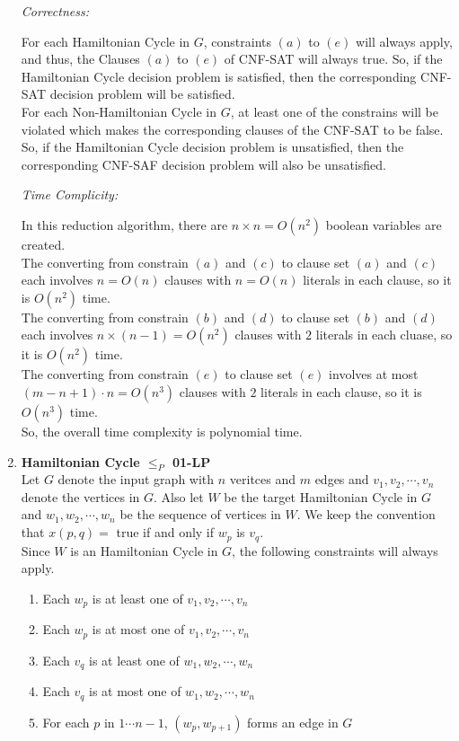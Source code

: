 \documentclass[12pt,letterpaper]{article}
\def\pp{\par\noindent}
\newcommand{\correctness}{\medskip\pp\textit{Correctness:}\par}
\newcommand{\timecomplexity}{\medskip\pp\textit{Time Complicity:}\par}
\begin{document}
\begin{enumerate}
\begin{enumerate}[itemsep=0mm]
		\end{enumerate}
		\correctness
		For each Hamiltonian Cycle in $G$, constraints $(a)$ to $(e)$ will always apply, and thus, the Clauses $(a)$ to $(e)$ of CNF-SAT will always true. So, if the Hamiltonian Cycle decision problem is satisfied, then the corresponding CNF-SAT decision problem will be satisfied.\\
		For each Non-Hamiltonian Cycle in $G$, at least one of the constrains will be violated which makes the corresponding clauses of the CNF-SAT to be false. So, if the Hamiltonian Cycle decision problem is unsatisfied, then the corresponding CNF-SAF decision problem will also be unsatisfied.
		\timecomplexity
		In this reduction algorithm, there are $n\times n=O(n^2)$ boolean variables are created.\\
		The converting from constrain $(a)$ and $(c)$ to clause set $(a)$ and $(c)$ each involves $n=O(n)$ clauses with $n=O(n)$ literals in each clause, so it is $O(n^2)$ time.\\
		The converting from constrain $(b)$ and $(d)$ to clause set $(b)$ and $(d)$ each involves $n\times(n-1)=O(n^2)$ clauses with $2$ literals in each cluase, so it is $O(n^2)$ time.\\
		The converting from constrain $(e)$ to clause set $(e)$ involves at most $(m-n+1)\cdot n=O(n^3)$ clauses with $2$ literals in each clause, so it is $O(n^3)$ time.\\
		So, the overall time complexity is polynomial time.
	\item \textbf{Hamiltonian Cycle $\leq_P$ 01-LP}\\
		Let $G$ denote the input graph with $n$ veritces and $m$ edges and $v_1, v_2, \cdots, v_n$ denote the vertices in $G$.
		Also let $W$ be the target Hamiltonian Cycle in $G$ and $w_1, w_2, \cdots, w_n$ be the sequence of vertices in $W$.
		We keep the convention that $x(p, q) = $ true if and only if $w_p$ is $v_q$.\\
		Since $W$ is an Hamiltonian Cycle in $G$, the following constraints will always apply.
		\begin{enumerate}[itemsep=0mm]
			\item Each $w_p$ is at least one of $v_1, v_2, \cdots, v_n$
			\item Each $w_p$ is at most one of $v_1, v_2, \cdots, v_n$
			\item Each $v_q$ is at least one of $w_1, w_2, \cdots, w_n$
			\item Each $v_q$ is at most one of $w_1, w_2, \cdots, w_n$
			\item For each $p$ in $1\cdots n-1$, $(w_p, w_{p+1})$ forms an edge in $G$

\end{enumerate}
\end{enumerate}
\end{document}
